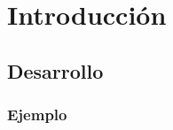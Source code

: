 \section{Introducción}
\lipsum[2-4]
\subsection{Desarrollo}
\lipsum[2-4]
\subsubsection{Ejemplo}
\lipsum[2-8]
